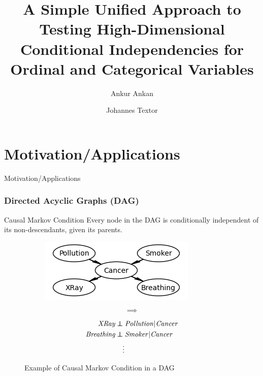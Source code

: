 \documentclass{beamer}
\def\ci{\perp\!\!\!\!\!\perp}
\begin{document}
\title[Unified CI test for Ordinal and Categorical Variables]{A Simple Unified Approach to Testing High-Dimensional Conditional Independencies for Ordinal and Categorical Variables}
\author {Ankur Ankan \and Johannes Textor}
\date{}
\maketitle


\section{Motivation/Applications}
\begin{frame}
	\begin{center} \Huge{Motivation/Applications} \end{center}
\end{frame}
\begin{frame}
	\frametitle{Directed Acyclic Graphs (DAG)}
	\begin{block}{Causal Markov Condition}
		Every node in the DAG is conditionally independent of its non-descendants, given its parents.
	\end{block}
	\begin{figure}
		\begin{subfigure}{0.46\textwidth}
			\centering
			\includegraphics[scale=0.7]{imgs/example_dag.png}
		\end{subfigure}%
		\begin{subfigure}{0.08\textwidth}
			$$ \bm{\implies} $$
		\end{subfigure}%
		\begin{subfigure}{0.46\textwidth}
			\begin{equation*}
				\begin{split}
					\text{\emph{XRay}} \ci & \text{ \emph{Pollution}} | \text{\emph{Cancer}} \\
					\text{\emph{Breathing}} \ci & \text{ \emph{Smoker}} | \text{\emph{Cancer}} \\
					& \vdots \\
				\end{split}
			\end{equation*}
		\end{subfigure}
		\caption*{Example of Causal Markov Condition in a DAG \footnotemark}
	\end{figure}
\end{frame}
\end{document}
